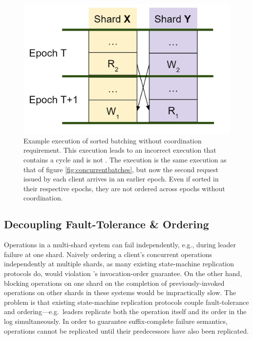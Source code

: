 \begin{figure}[!htb]
\includegraphics[scale=.3]{sorted_batching_wrong.png}
\caption{Example execution of sorted batching without coordination requirement. This execution leads to an incorrect execution that contains a cycle and is not \mdl. The execution is the same execution as that of figure \ref{fig:concurrentbatches}, but now the second request issued by each client arrives in an earlier epoch. Even if sorted in their respective epochs, they are not ordered across epochs without coordination.}
\label{fig:sortedbatchingwrong}
\end{figure}


\subsection{Decoupling Fault-Tolerance \& Ordering}

Operations in a multi-shard system can fail independently, e.g., during leader
failure at one shard. Naively ordering a client's concurrent operations
independently at multiple shards, as many existing state-machine replication
protocols do, would violation \MDL{}'s invocation-order guarantee. On the other
hand, blocking operations on one shard on the completion of previously-invoked
operations on other shards in these systems would be impractically slow. The
problem is that existing state-machine replication protocols couple
fault-tolerance and ordering---e.g.\ leaders replicate both the operation itself
and its order in the log simultaneously. In order to guarantee suffix-complete
failure semantics, operations cannot be replicated until their predecessors have
also been replicated.

